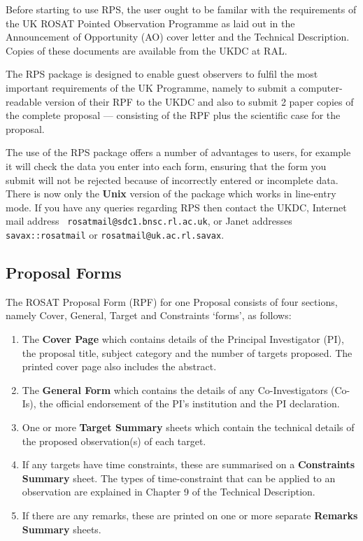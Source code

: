 Before starting to use RPS, the user ought to be familar with the
requirements of the UK ROSAT Pointed Observation Programme as laid out
in the Announcement of Opportunity (AO) cover letter and the Technical
Description. Copies of these documents are available from the UKDC at
RAL. 

The RPS package is designed to enable guest observers to fulfil the
most important requirements of the UK Programme, namely to submit a
computer-readable version of their RPF to the UKDC and also to submit 2
paper copies of the complete proposal --- consisting of the RPF plus
the scientific case for the proposal.

The use of the RPS package offers a number of advantages to users, for
example it will check the data you enter into each form, ensuring that
the form you submit will not be rejected because of incorrectly entered
or incomplete data.  There is now only the {\bf Unix} version of the
package which works in line-entry mode.  If you have any queries
regarding RPS then contact the UKDC, Internet mail address  {\tt
rosatmail@sdc1.bnsc.rl.ac.uk}, or Janet addresses {\tt
savax::rosatmail} or {\tt rosatmail@uk.ac.rl.savax}.

\subsection{Proposal Forms}
\label{sse:forms}

The ROSAT Proposal Form (RPF) for one Proposal consists of four
sections, namely Cover, General, Target and Constraints `forms',
as follows:

\begin{enumerate}

\item The {\bf Cover Page} which contains details of the Principal
Investigator (PI), the proposal title, subject category and the number
of targets proposed. The printed cover page also includes the abstract.

\item The {\bf General Form} which contains the
details of any Co-Investigators (Co-Is), the official endorsement of
the PI's institution and the PI declaration.

\item One or more {\bf Target Summary} sheets which contain the
technical details of the proposed observation(s) of each target.

\item If any targets have time constraints, these are summarised on a
{\bf Constraints Summary} sheet. The types of time-constraint that can
be applied to an observation are explained in Chapter 9 of the
Technical Description.

\item If there are any remarks, these are printed on one or more separate 
{\bf Remarks Summary} sheets.

\end{enumerate}

